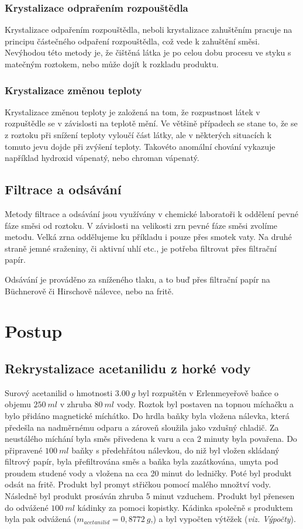 \documentclass[13pt, a4paper, twoside]{article}
\begin{document}
    \subsubsection*{Krystalizace odprařením rozpouštědla}
    Krystalizace odpařením rozpouštědla, neboli krystalizace zahuštěním pracuje na principu
    částečného odpaření rozpouštědla, což vede k zahuštění směsi. Nevýhodou této metody je,
    že čištěná látka je po celou dobu procesu ve styku s matečným roztokem, nebo může dojít k rozkladu
    produktu.
    \subsubsection*{Krystalizace změnou teploty}
    Krystalizace změnou teploty je založená na tom, že rozpustnost látek v rozpuštědle se
    v závislosti na teplotě mění. Ve většině případech se stane to, že se z roztoku při snížení
    teploty vyloučí část látky, ale v některých situacích k tomuto jevu dojde při zvýšení teploty.
    Takovéto anomální chování vykazuje například hydroxid vápenatý, nebo chroman vápenatý.
    \subsection*{Filtrace a odsávání}
    Metody filtrace a odsávání jsou využívány v chemické laboratoři k oddělení pevné fáze
    směsi od roztoku. V závislosti na velikosti zrn pevné fáze směsi zvolíme metodu. Velká
    zrna oddělujeme ku příkladu i pouze přes smotek vaty. Na druhé straně jemné sraženiny, či aktivní
    uhlí etc., je potřeba filtrovat přes filtrační papír.

    Odsávání je prováděno za sníženého tlaku, a to buď přes filtrační papír na Büchnerově či Hirschově nálevce, nebo
    na fritě.

    \section*{Postup}

    \subsection*{Rekrystalizace acetanilidu z horké vody}
    Surový acetanilid o hmotnosti $3.00 \: g$ byl rozpuštěn v Erlenmeyeřově baňce o objemu
    $250 \: ml$ v zhruba $80\: ml$ vody. Roztok byl postaven na topnou míchačku a bylo přidáno magnetické míchátko. Do hrdla baňky byla vložena nálevka, která předešla na nadměrnému
    odparu a zároveň sloužila jako vzdušný chladič. Za neustálého míchání byla směs přivedena
    k varu a cca 2 minuty byla povařena. Do připravené $100 \: ml$ baňky s předehřátou nálevkou,
    do niž byl vložen skládaný filtrový papír, byla přefiltrována směs a baňka byla zazátkována,
    umyta pod proudem studené vody a vložena na cca 20 minut do ledničky. Poté byl produkt odsát
    na fritě. Produkt byl promyt střičkou pomocí malého množtví vody. Následně byl produkt
    prosáván zhruba 5 minut vzduchem. Produkt byl přenesen do odvážené $100 \: ml$ kádinky za pomoci
    kopistky. Kádinka společně s produktem byla pak odvážená ($m_{acetanilid}=0,8772\: g$,) a byl vypočten výtěžek (\emph{viz. Výpočty}).
\end{document}
